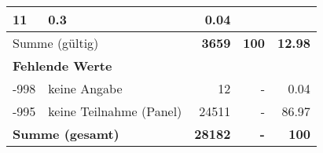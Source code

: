 \begin{longtable}{lXrrr}
       \num{11} &
       \num[round-mode=places,round-precision=2]{0,3} &
         \num[round-mode=places,round-precision=2]{0,04} \\
     \midrule
     \multicolumn{2}{l}{Summe (gültig)} &
       \textbf{\num{3659}} &
     \textbf{100} &
       \textbf{\num[round-mode=places,round-precision=2]{12,98}} \\
     \multicolumn{5}{l}{\textbf{Fehlende Werte}}\\
       -998 &
       keine Angabe &
         \num{12} &
        - &
         \num[round-mode=places,round-precision=2]{0,04} \\
       -995 &
       keine Teilnahme (Panel) &
         \num{24511} &
        - &
         \num[round-mode=places,round-precision=2]{86,97} \\
     \midrule
     \multicolumn{2}{l}{\textbf{Summe (gesamt)}} &
          \textbf{\num{28182}} &
        \textbf{-} &
        \textbf{100} \\
     \bottomrule
     \end{longtable}
     
